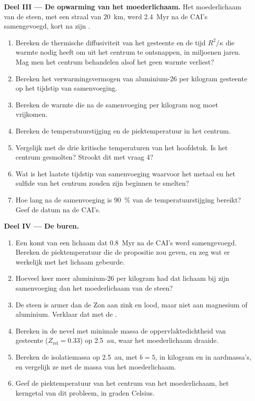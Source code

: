 \begin{problem}
\noindent\textbf{Deel III --- De opwarming van het moederlichaam.}
Het moederlichaam van de steen, met een straal van \qty{20}{km}, werd \qty{2.4}{Myr} na
de CAI's samengevoegd, kort na zijn .
\begin{enumerate}[resume]
  \item Bereken de thermische diffusiviteit van het gesteente en de tijd $R^2/\kappa$ die
        warmte nodig heeft om uit het centrum te ontsnappen, in miljoenen jaren. Mag men het centrum
        behandelen alsof het geen warmte verliest?
  \item Bereken het verwarmingsvermogen van aluminium-26 per kilogram gesteente op het tijdstip
        van samenvoeging.
  \item Bereken de warmte die na de samenvoeging per kilogram nog moet vrijkomen.
  \item Bereken de temperatuurstijging en de piektemperatuur in het centrum.
  \item Vergelijk met de drie kritische temperaturen van het hoofdstuk. Is het
        centrum gesmolten? Strookt dit met vraag 4?
  \item Wat is het laatste tijdstip van samenvoeging waarvoor het metaal en het sulfide van het
        centrum zouden zijn beginnen te smelten?
  \item Hoe lang na de samenvoeging is \qty{90}{\percent} van de temperatuurstijging
        bereikt? Geef de datum na de CAI's.
\end{enumerate}

\noindent\textbf{Deel IV --- De buren.}
\begin{enumerate}[resume]
  \item Een  komt van een lichaam dat \qty{0.8}{Myr} na de
        CAI's werd samengevoegd. Bereken de piektemperatuur die de propositie zou geven, en zeg
        wat er werkelijk met het lichaam gebeurde.
  \item Hoeveel keer meer aluminium-26 per kilogram had dat lichaam bij zijn
        samenvoeging dan het moederlichaam van de steen?
  \item De steen is armer dan de Zon aan zink en lood, maar niet aan magnesium of
        aluminium. Verklaar dat met de .
  \item Bereken in de nevel met minimale massa de oppervlaktedichtheid van gesteente
        ($Z_{\mathrm{rel}} = 0.33$) op \qty{2.5}{au}, waar het moederlichaam
        draaide.
  \item Bereken de isolatiemassa op \qty{2.5}{au}, met $b = 5$, in kilogram en
        in aardmassa's, en vergelijk ze met de massa van het moederlichaam.
  \item Geef de piektemperatuur van het centrum van het moederlichaam, het kerngetal
        van dit probleem, in graden Celsius.
\end{enumerate}
\end{problem}
